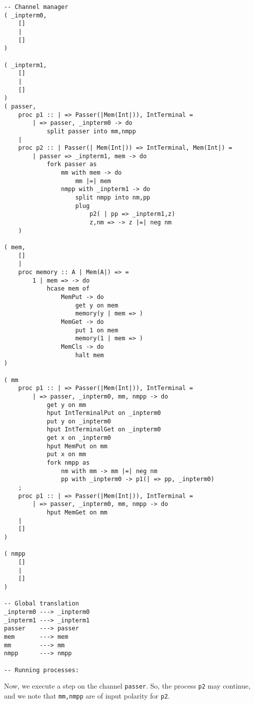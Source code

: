 \documentclass{article}
\theoremstyle{plain}%
\theoremstyle{definition}
\theoremstyle{remark}
\begin{document}
\begin{verbatim}
-- Channel manager
( _inpterm0,  
    []
    |
    []
)

( _inpterm1,  
    []
    |
    []
)
( passer,
    proc p1 :: | => Passer(|Mem(Int|)), IntTerminal = 
        | => passer, _inpterm0 -> do
            split passer into mm,nmpp 
    |
    proc p2 :: | Passer(| Mem(Int|)) => IntTerminal, Mem(Int|) =
        | passer => _inpterm1, mem -> do
            fork passer as
                mm with mem -> do
                    mm |=| mem
                nmpp with _inpterm1 -> do
                    split nmpp into nm,pp
                    plug
                        p2( | pp => _inpterm1,z)
                        z,nm => -> z |=| neg nm
    )

( mem,
    []
    |
    proc memory :: A | Mem(A|) => =
        1 | mem => -> do
            hcase mem of
                MemPut -> do
                    get y on mem
                    memory(y | mem => )
                MemGet -> do
                    put 1 on mem
                    memory(1 | mem => )
                MemCls -> do
                    halt mem
)

( mm
    proc p1 :: | => Passer(|Mem(Int|)), IntTerminal = 
        | => passer, _inpterm0, mm, nmpp -> do
            get y on mm
            hput IntTerminalPut on _inpterm0
            put y on _inpterm0
            hput IntTerminalGet on _inpterm0
            get x on _inpterm0
            hput MemPut on mm
            put x on mm
            fork nmpp as
                nm with mm -> mm |=| neg nm 
                pp with _inpterm0 -> p1(| => pp, _inpterm0)
    ;
    proc p1 :: | => Passer(|Mem(Int|)), IntTerminal = 
        | => passer, _inpterm0, mm, nmpp -> do
            hput MemGet on mm 
    |
    []
)

( nmpp
    []
    |
    []
)

-- Global translation
_inpterm0 ---> _inpterm0 
_inpterm1 ---> _inpterm1 
passer    ---> passer 
mem       ---> mem
mm        ---> mm
nmpp      ---> nmpp

-- Running processes:
\end{verbatim}
Now, we execute a step on the channel \verb|passer|.
So, the process \verb|p2| may continue, and we note that
    \verb|mm,nmpp| are of input polarity for \verb|p2|.
\end{document}
